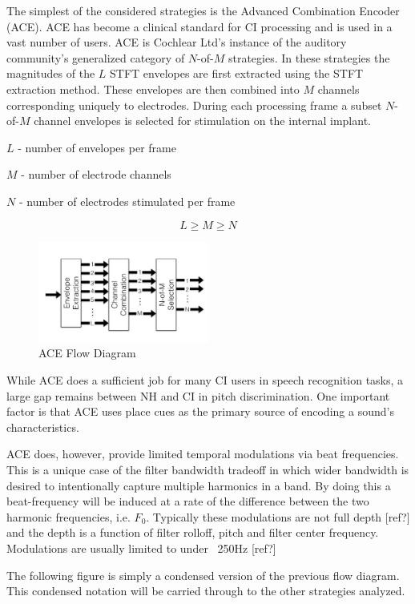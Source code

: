 \documentclass [11pt, proquest] {uwthesis}[2015/03/03]
\begin{document}
The simplest of the considered strategies is the Advanced Combination Encoder (ACE).  ACE has become a clinical standard for CI processing and is used in a vast number of users.  ACE is Cochlear Ltd's instance of the auditory community's generalized category of $N$-of-$M$ strategies.  In these strategies the magnitudes of the $L$ STFT envelopes are first extracted using the STFT extraction method.  These envelopes are then combined into $M$ channels corresponding uniquely to electrodes.  During each processing frame a subset $N$-of-$M$ channel envelopes is selected for stimulation on the internal implant.

$L$ - number of envelopes per frame

$M$ - number of electrode channels

$N$ - number of electrodes stimulated per frame

$$L \geq M \geq N$$

\begin{figure}[!ht]
  \centering
    \includegraphics[width=0.5\textwidth]{ACE_flow_diagram_explicitTEMP}   
    \caption{ACE Flow Diagram}
\end{figure}

While ACE does a sufficient job for many CI users in speech recognition tasks, a large gap remains between NH and CI in pitch discrimination.  One important factor is that ACE uses place cues as the primary source of encoding a sound's characteristics.

ACE does, however, provide limited temporal modulations via beat frequencies.  This is a unique case of the filter bandwidth tradeoff in which wider bandwidth is desired to intentionally capture multiple harmonics in a band.  By doing this a beat-frequency will be induced at a rate of the difference between the two harmonic frequencies, i.e. $F_0$.  Typically these modulations are not full depth [ref?] and the depth is a function of filter rolloff, pitch and filter center frequency.  Modulations are usually limited to under ~250Hz [ref?]

The following figure is simply a condensed version of the previous flow diagram.  This condensed notation will be carried through to the other strategies analyzed.
\end{document}

